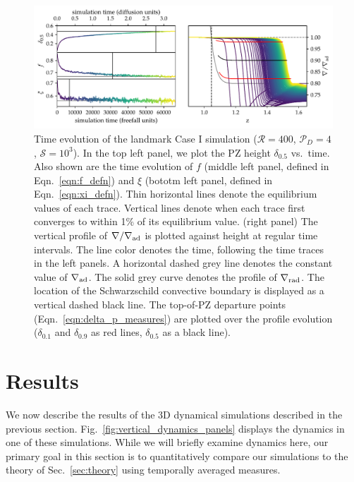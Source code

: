 \documentclass[twocolumn]{aastex631}
\newcommand{\gradrad}{\ensuremath{\nabla_{\rm{rad}}}}
\newcommand{\gradad}{\ensuremath{\nabla_{\rm{ad}}}}
\newcommand{\justgrad}{\ensuremath{\nabla}}
\newcommand{\mP}{\ensuremath{\mathcal{P}}}
\newcommand{\mR}{\ensuremath{\mathcal{R}}}
\newcommand{\mS}{\ensuremath{\mathcal{S}}}
\begin{document}
\begin{figure}[t]
\centering
\includegraphics[width=\textwidth]{time_evolution.pdf}
\caption{
Time evolution of the landmark Case I simulation ($\mR = 400$, $\mP_D = 4$, $\mS = 10^3$).
In the top left panel, we plot the PZ height $\delta_{0.5}$ vs.~time.
Also shown are the time evolution of $f$ (middle left panel, defined in Eqn.~\ref{eqn:f_defn}) and $\xi$ (bototm left panel, defined in Eqn.~\ref{eqn:xi_defn}).
Thin horizontal lines denote the equilibrium values of each trace.
Vertical lines denote when each trace first converges to within 1\% of its equilibrium value.
(right panel) The vertical profile of $\justgrad/\gradad$ is plotted against height at regular time intervals.
The line color denotes the time, following the time traces in the left panels.
A horizontal dashed grey line denotes the constant value of $\gradad$.
The solid grey curve denotes the profile of $\gradrad$.
The location of the Schwarzschild convective boundary is displayed as a vertical dashed black line.
The top-of-PZ departure points (Eqn.~\ref{eqn:delta_p_measures}) are plotted over the profile evolution ($\delta_{0.1}$ and $\delta_{0.9}$ as red lines, $\delta_{0.5}$ as a black line).
\label{fig:time_evolution}
}
\end{figure}


\section{Results}
\label{sec:results}

We now describe the results of the 3D dynamical simulations described in the previous section.
Fig.~\ref{fig:vertical_dynamics_panels} displays the dynamics in one of these simulations.
While we will briefly examine dynamics here, our primary goal in this section is to quantitatively compare our simulations to the theory of Sec.~\ref{sec:theory} using temporally averaged measures.
\end{document}
